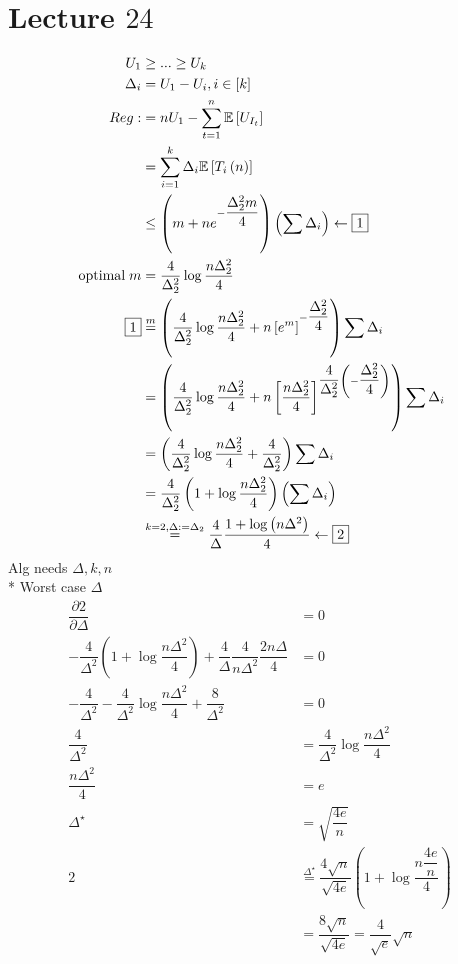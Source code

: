 \documentclass{article}
\begin{document}
\section{Lecture $24$} 
\begin{align*}
U_{1} &\geq  ... \geq  U_{k}
\\ \Delta_{i} &= U_{1} - U_{i} , i \in \left[k\right]
\\ Reg  :&= n U_{1} - \displaystyle\sum_{t=1}^{n} \mathbb{E}\left[U_{I_{t}}\right]
\\ &= \displaystyle\sum_{i=1}^{k} \Delta_{i} \mathbb{E}\left[T_{i}\left(n\right)\right]
\\ &\leq  \left(m + n e^{- \dfrac{\Delta_{2}^{2} m}{4}}\right) \left(\displaystyle\sum \Delta_{i}\right) \leftarrow \boxed{1}
\\ \text{\;optimal\;} m &= \dfrac{4}{\Delta_{2}^{2}} \log \dfrac{n \Delta_{2}^{2}}{4}
\\ \boxed{1} &\stackrel{m}{=} \left(\dfrac{4}{\Delta_{2}^{2}} \log \dfrac{n \Delta_{2}^{2}}{4} + n \left[e^{m}\right]^{- \dfrac{\Delta_{2}^{2}}{4}}\right) \displaystyle\sum \Delta_{i}
\\ &= \left(\dfrac{4}{\Delta_{2}^{2}} \log \dfrac{n \Delta_{2}^{2}}{4} + n \left[\dfrac{n \Delta_{2}^{2}}{4}\right]^{\dfrac{4}{\Delta_{2}^{2}} \left(- \dfrac{\Delta_{2}^{2}}{4}\right)}\right) \displaystyle\sum \Delta_{i}
\\ &= \left(\dfrac{4}{\Delta_{2}^{2}} \log \dfrac{n \Delta_{2}^{2}}{4} + \dfrac{4}{\Delta_{2}^{2}}\right) \displaystyle\sum \Delta_{i}
\\ &= \dfrac{4}{\Delta_{2}^{2}} \left(1 + \log \dfrac{n \Delta_{2}^{2}}{4}\right) \left(\displaystyle\sum \Delta_{i}\right)
\\ &\stackrel{k = 2, \Delta := \Delta_{2}}{=} \dfrac{4}{\Delta} \dfrac{1 + \log \left(n \Delta^{2}\right)}{4} \leftarrow \boxed{2}
\end{align*}
Alg needs $\Delta, k, n $
\\* Worst case $\Delta$
\newline \newline
\begin{align*}
\dfrac{\partial \boxed{2}}{\partial \Delta} &= 0
\\ - \dfrac{4}{\Delta^{2}} \left(1 + \log \dfrac{n \Delta^{2}}{4}\right) + \dfrac{4}{\Delta} \dfrac{4}{n \Delta^{2}} \dfrac{2 n \Delta}{4} &= 0
\\ - \dfrac{4}{\Delta^{2}} - \dfrac{4}{\Delta^{2}} \log \dfrac{n \Delta^{2}}{4} + \dfrac{8}{\Delta^{2}} &= 0
\\ \dfrac{4}{\Delta^{2}} &= \dfrac{4}{\Delta^{2}} \log \dfrac{n \Delta^{2}}{4}
\\ \dfrac{n \Delta^{2}}{4} &= e 
\\ \Delta^\star  &= \sqrt{\dfrac{4 e}{n}}
\\ \boxed{2} &\stackrel{\Delta^\star }{=} \dfrac{4 \sqrt{n}}{\sqrt{4 e}} \left(1 + \log \dfrac{n \dfrac{4 e}{n}}{4}\right)
\\ &= \dfrac{8 \sqrt{n}}{\sqrt{4 e}} = \dfrac{4}{\sqrt{e}} \sqrt{n}
\end{align*}
\end{document}
